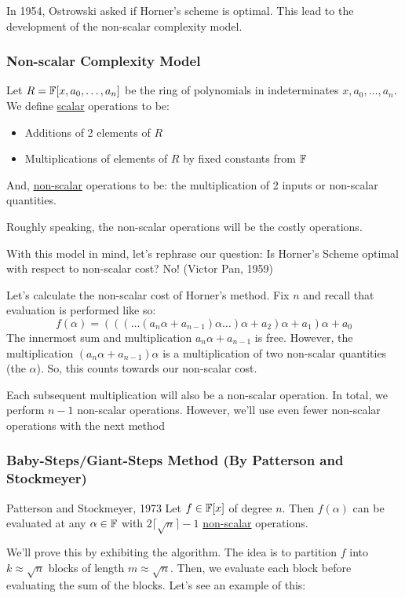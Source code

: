 In 1954, Ostrowski asked if Horner's scheme is optimal.
This lead to the development of the non-scalar complexity model.

\subsubsection{Non-scalar Complexity Model}
Let $R = \operatorname{\mathbb{F}}[x, a_0, \ldots, a_n]$ be the ring of polynomials in indeterminates $x, a_0, \ldots, a_n$.
We define \underline{scalar} operations to be:
\begin{itemize}
    \item Additions of 2 elements of $R$
    \item Multiplications of elements of $R$ by fixed constants from $\operatorname{\mathbb{F}}$
\end{itemize}
And, \underline{non-scalar} operations to be: the multiplication of 2 inputs or non-scalar quantities.

Roughly speaking, the non-scalar operations will be the costly operations.

With this model in mind, let's rephrase our question: Is Horner's Scheme optimal with respect to non-scalar cost?
No! (Victor Pan, 1959)

Let's calculate the non-scalar cost of Horner's method.
Fix $n$ and recall that evaluation is performed like so:
\begin{equation*}
    f(\alpha) = (((\ldots(a_n\alpha + a_{n-1})\alpha\ldots)\alpha + a_2)\alpha + a_1)\alpha + a_0
\end{equation*}
The innermost sum and multiplication $a_n\alpha + a_{n-1}$ is free.
However, the multiplication $(a_n\alpha + a_{n-1})\alpha$ is a multiplication of two non-scalar quantities (the $\alpha$).
So, this counts towards our non-scalar cost.

Each subsequent multiplication will also be a non-scalar operation.
In total, we perform $n-1$ non-scalar operations.
However, we'll use even fewer non-scalar operations with the next method

\subsubsection{Baby-Steps/Giant-Steps Method (By Patterson and Stockmeyer)}
\begin{theorem}{Patterson and Stockmeyer, 1973}{}
    Let $f \in \operatorname{\mathbb{F}}[x]$ of degree $n$. Then $f(\alpha)$ can be evaluated at any $\alpha \in \operatorname{\mathbb{F}}$ with $2\lceil \sqrt{n} \rceil - 1$ \underline{non-scalar} operations.
\end{theorem}
We'll prove this by exhibiting the algorithm.
The idea is to partition $f$ into $k \approx \sqrt{n}$ blocks of length $m \approx \sqrt{n}$.
Then, we evaluate each block before evaluating the sum of the blocks.
Let's see an example of this:

